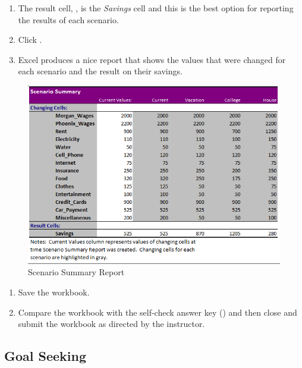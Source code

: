 \begin{enumerate}[resume]	
	
	\item The result cell, , is the \textit{Savings} cell and this is the best option for reporting the results of each scenario.
	\item Click .
	\item Excel produces a nice report that shows the values that were changed for each scenario and the result on their savings. 
\end{enumerate}

\begin{figure}[H]
	\centering
	\includegraphics[width=\maxwidth{.95\linewidth}]{gfx/ch08_fig59}
	\caption{Scenario Summary Report}
	\label{08:fig59}
\end{figure}

\begin{enumerate}[resume]
	\item Save the  workbook.
	
	\item Compare the workbook with the self-check answer key () and then close and submit the  workbook as directed by the instructor.
		
\end{enumerate}

\subsection{Goal Seeking}

